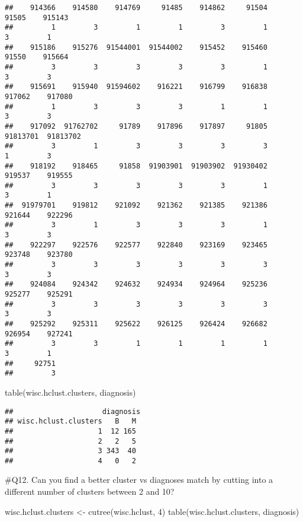 \documentclass[
]{article}
\newenvironment{Shaded}{\begin{snugshade}}{\end{snugshade}}
\newcommand{\DecValTok}[1]{\textcolor[rgb]{0.00,0.00,0.81}{#1}}
\newcommand{\FunctionTok}[1]{\textcolor[rgb]{0.00,0.00,0.00}{#1}}
\newcommand{\NormalTok}[1]{#1}
\newcommand{\OtherTok}[1]{\textcolor[rgb]{0.56,0.35,0.01}{#1}}
\begin{document}
\begin{verbatim}
##    914366    914580    914769     91485    914862     91504     91505    915143 
##         1         3         1         1         3         1         3         1 
##    915186    915276  91544001  91544002    915452    915460     91550    915664 
##         3         3         3         3         3         1         3         3 
##    915691    915940  91594602    916221    916799    916838    917062    917080 
##         1         3         3         3         1         1         3         3 
##    917092  91762702     91789    917896    917897     91805  91813701  91813702 
##         3         1         3         3         3         3         1         3 
##    918192    918465     91858  91903901  91903902  91930402    919537    919555 
##         3         3         3         3         3         1         3         1 
##  91979701    919812    921092    921362    921385    921386    921644    922296 
##         3         1         3         3         3         1         3         3 
##    922297    922576    922577    922840    923169    923465    923748    923780 
##         3         3         3         3         3         3         3         3 
##    924084    924342    924632    924934    924964    925236    925277    925291 
##         3         3         3         3         3         3         3         3 
##    925292    925311    925622    926125    926424    926682    926954    927241 
##         3         3         1         1         1         1         3         1 
##     92751 
##         3
\end{verbatim}

\begin{Shaded}
\begin{Highlighting}[]
\FunctionTok{table}\NormalTok{(wisc.hclust.clusters, diagnosis)}
\end{Highlighting}
\end{Shaded}

\begin{verbatim}
##                     diagnosis
## wisc.hclust.clusters   B   M
##                    1  12 165
##                    2   2   5
##                    3 343  40
##                    4   0   2
\end{verbatim}

\#Q12. Can you find a better cluster vs diagnoses match by cutting into
a different number of clusters between 2 and 10?

\begin{Shaded}
\begin{Highlighting}[]
\NormalTok{wisc.hclust.clusters }\OtherTok{\textless{}{-}} \FunctionTok{cutree}\NormalTok{(wisc.hclust, }\DecValTok{4}\NormalTok{)}
\FunctionTok{table}\NormalTok{(wisc.hclust.clusters, diagnosis)}
\end{Highlighting}
\end{Shaded}
\end{document}
